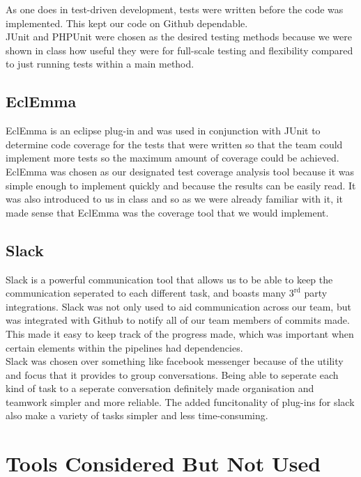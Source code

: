 \documentclass[12pt]{report}
\begin{document}
As one does in test-driven development, tests were written before the code was implemented. This kept our code on Github dependable.\\

JUnit and PHPUnit were chosen as the desired testing methods because we were shown in class how useful they were for full-scale testing and flexibility compared to just running tests within a main method. 

\subsection{EclEmma}
EclEmma is an eclipse plug-in and was used in conjunction with JUnit to determine code coverage for the tests that were written so that the team could implement more tests so the maximum amount of coverage could be achieved. \\

EclEmma was chosen as our designated test coverage analysis tool because it was simple enough to implement quickly and because the results can be easily read. It was also introduced to us in class and so as we were already familiar with it, it made sense that EclEmma was the coverage tool that we would implement.

\subsection{Slack}
Slack is a powerful communication tool that allows us to be able to keep the communication seperated to each different task, and boasts many $3^{\text{rd}}$ party integrations. Slack was not only used to aid communication across our team, but was integrated with Github to notify all of our team members of commits made. This made it easy to keep track of the progress made, which was important when certain elements within the pipelines had dependencies.\\

Slack was chosen over something like facebook messenger because of the utility and focus that it provides to group conversations. Being able to seperate each kind of task to a seperate conversation definitely made organisation and teamwork simpler and more reliable. The added funcitonality of plug-ins for slack also make a variety of tasks simpler and less time-consuming.

\section{Tools Considered But Not Used}
\end{document}
